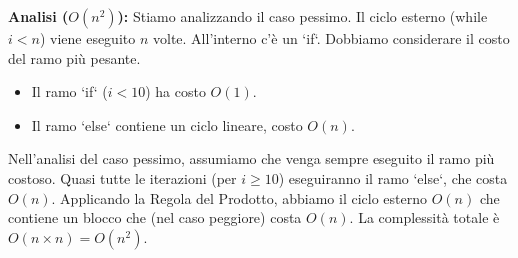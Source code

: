 \begin{example}
\textbf{Analisi ($O(n^2)$):} Stiamo analizzando il caso pessimo. Il ciclo esterno (while $i<n$) viene eseguito $n$ volte. All'interno c'è un `if`. Dobbiamo considerare il costo del ramo più pesante.
\begin{itemize}
    \item Il ramo `if` ($i<10$) ha costo $O(1)$.
    \item Il ramo `else` contiene un ciclo lineare, costo $O(n)$.
\end{itemize}
Nell'analisi del caso pessimo, assumiamo che venga sempre eseguito il ramo più costoso. Quasi tutte le iterazioni (per $i \ge 10$) eseguiranno il ramo `else`, che costa $O(n)$.
Applicando la Regola del Prodotto, abbiamo il ciclo esterno $O(n)$ che contiene un blocco che (nel caso peggiore) costa $O(n)$. La complessità totale è $O(n \times n) = O(n^2)$.
\end{example}

\newpage